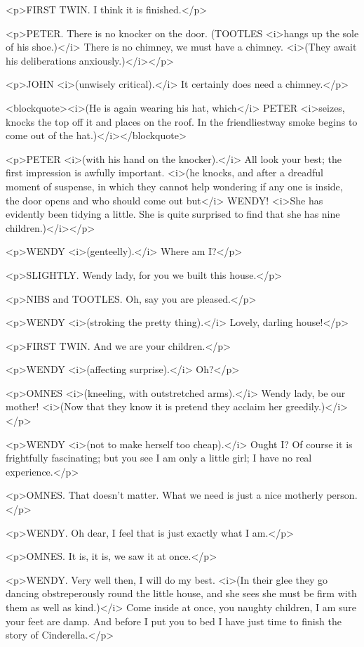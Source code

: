 <p>FIRST TWIN. I think it is finished.</p>

<p>PETER. There is no knocker on the door. (TOOTLES <i>hangs up the sole of his shoe.)</i> There is no chimney, we must have a chimney. <i>(They await his deliberations anxiously.)</i></p>

<p>JOHN <i>(unwisely critical).</i> It certainly does need a chimney.</p>

<blockquote><i>(He is again wearing his hat, which</i> PETER <i>seizes, knocks the top off it and places on the roof. In the friendliestway smoke begins to come out of the hat.)</i></blockquote>

<p>PETER <i>(with his hand on the knocker).</i> All look your best; the first impression is awfully important. <i>(he knocks, and after a dreadful moment of suspense, in which they cannot help wondering if any one is inside, the door opens and who should come out but</i> WENDY! <i>She has evidently been tidying a little. She is quite surprised to find that she has nine children.)</i></p>

<p>WENDY <i>(genteelly).</i> Where am I?</p>

<p>SLIGHTLY. Wendy lady, for you we built this house.</p>

<p>NIBS and TOOTLES. Oh, say you are pleased.</p>

<p>WENDY <i>(stroking the pretty thing).</i> Lovely, darling house!</p>

<p>FIRST TWIN. And we are your children.</p>

<p>WENDY <i>(affecting surprise).</i> Oh?</p>

<p>OMNES <i>(kneeling, with outstretched arms).</i> Wendy lady, be our mother! <i>(Now that they know it is pretend they acclaim her greedily.)</i></p>

<p>WENDY <i>(not to make herself too cheap).</i> Ought I? Of course it is frightfully fascinating; but you see I am only a little girl; I have no real experience.</p>

<p>OMNES. That doesn't matter. What we need is just a nice motherly person.</p>

<p>WENDY. Oh dear, I feel that is just exactly what I am.</p>

<p>OMNES. It is, it is, we saw it at once.</p>

<p>WENDY. Very well then, I will do my best. <i>(In their glee they go dancing obstreperously round the little house, and she sees she must be firm with them as well as kind.)</i> Come inside at once, you naughty children, I am sure your feet are damp. And before I put you to bed I have just time to finish the story of Cinderella.</p>

